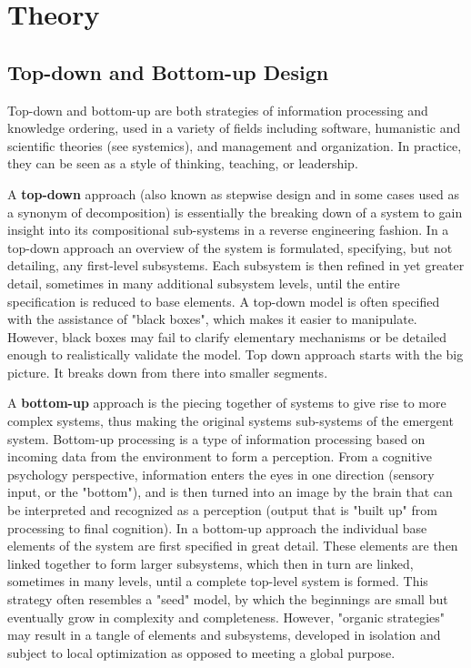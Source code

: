 \documentclass[12pt,a4paper,titlepage]{article}
\begin{document}
\section{Theory}

\subsection{Top-down and Bottom-up Design}
Top-down and bottom-up are both strategies of information processing and knowledge ordering, used in a variety of fields including software, humanistic and scientific theories (see systemics), and management and organization. In practice, they can be seen as a style of thinking, teaching, or leadership.\par
A \textbf{top-down} approach (also known as stepwise design and in some cases used as a synonym of decomposition) is essentially the breaking down of a system to gain insight into its compositional sub-systems in a reverse engineering fashion. In a top-down approach an overview of the system is formulated, specifying, but not detailing, any first-level subsystems. Each subsystem is then refined in yet greater detail, sometimes in many additional subsystem levels, until the entire specification is reduced to base elements. A top-down model is often specified with the assistance of "black boxes", which makes it easier to manipulate. However, black boxes may fail to clarify elementary mechanisms or be detailed enough to realistically validate the model. Top down approach starts with the big picture. It breaks down from there into smaller segments.\par
A \textbf{bottom-up} approach is the piecing together of systems to give rise to more complex systems, thus making the original systems sub-systems of the emergent system. Bottom-up processing is a type of information processing based on incoming data from the environment to form a perception. From a cognitive psychology perspective, information enters the eyes in one direction (sensory input, or the "bottom"), and is then turned into an image by the brain that can be interpreted and recognized as a perception (output that is "built up" from processing to final cognition). In a bottom-up approach the individual base elements of the system are first specified in great detail. These elements are then linked together to form larger subsystems, which then in turn are linked, sometimes in many levels, until a complete top-level system is formed. This strategy often resembles a "seed" model, by which the beginnings are small but eventually grow in complexity and completeness. However, "organic strategies" may result in a tangle of elements and subsystems, developed in isolation and subject to local optimization as opposed to meeting a global purpose.\par
\clearpage
\end{document}
